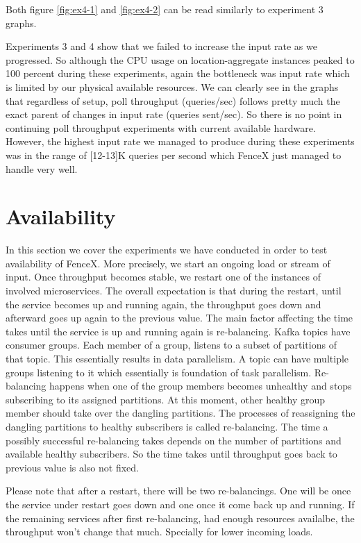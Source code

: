 \documentclass[a4]{report}
\begin{document}
    Both figure \ref{fig:ex4-1} and \ref{fig:ex4-2} can be read similarly to experiment 3 graphs.

    Experiments 3 and 4 show that we failed to increase the input rate as we progressed.
    So although the CPU usage on location-aggregate instances peaked to 100 percent during these experiments,
    again the bottleneck was input rate which is limited by our physical available resources.
    We can clearly see in the graphs that regardless of setup, poll throughput (queries/sec) follows pretty
    much the exact parent of changes in input rate (queries sent/sec).
    So there is no point in continuing poll throughput experiments with current available hardware.
    However, the highest input rate we managed to produce during these experiments was in the range of [12-13]K queries
    per second which FenceX just managed to handle very well.


    \section{Availability}
    In this section we cover the experiments we have conducted in order to test availability of FenceX.
    More precisely, we start an ongoing load or stream of input.
    Once throughput becomes stable, we restart one of the instances of involved microservices.
    The overall expectation is that during the restart, until the service becomes up and running again, the throughput
    goes down and afterward goes up again to the previous value.
    The main factor affecting the time takes until the service is up and running again is re-balancing.
    Kafka topics have consumer groups.
    Each member of a group, listens to a subset of partitions of that topic.
    This essentially results in data parallelism.
    A topic can have multiple groups listening to it which essentially is foundation of task parallelism.
    Re-balancing happens when one of the group members becomes unhealthy and stops subscribing to its assigned
    partitions.
    At this moment, other healthy group member should take over the dangling partitions.
    The processes of reassigning the dangling partitions to healthy subscribers is called re-balancing.
    The time a possibly successful re-balancing takes depends on the number of partitions and available
    healthy subscribers.
    So the time takes until throughput goes back to previous value is also not fixed.

    Please note that after a restart, there will be two re-balancings.
    One will be once the service under restart goes down and one once it come back up and running.
    If the remaining services after first re-balancing, had enough resources availalbe, the throughput won't change
    that much.
    Specially for lower incoming loads.
\end{document}
